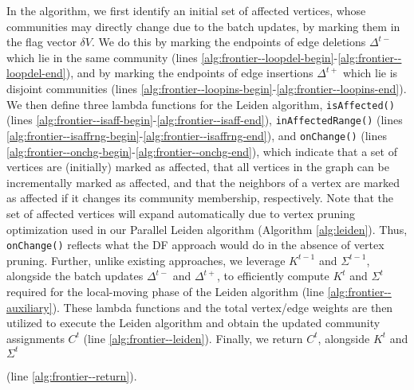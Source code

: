 In the algorithm, we first identify an initial set of affected vertices, whose communities may directly change due to the batch updates, by marking them in the flag vector $\delta V$. We do this by marking the endpoints of edge deletions $\Delta^{t-}$ which lie in the same community (lines \ref{alg:frontier--loopdel-begin}-\ref{alg:frontier--loopdel-end}), and by marking the endpoints of edge insertions $\Delta^{t+}$ which lie is disjoint communities (lines \ref{alg:frontier--loopins-begin}-\ref{alg:frontier--loopins-end}). We then define three lambda functions for the Leiden algorithm, \texttt{isAffected()} (lines \ref{alg:frontier--isaff-begin}-\ref{alg:frontier--isaff-end}), \texttt{inAffectedRange()} (lines \ref{alg:frontier--isaffrng-begin}-\ref{alg:frontier--isaffrng-end}), and \texttt{onChange()} (lines \ref{alg:frontier--onchg-begin}-\ref{alg:frontier--onchg-end}), which indicate that a set of vertices are (initially) marked as affected, that all vertices in the graph can be incrementally marked as affected, and that the neighbors of a vertex are marked as affected if it changes its community membership, respectively. Note that the set of affected vertices will expand automatically due to vertex pruning optimization used in our Parallel Leiden algorithm (Algorithm \ref{alg:leiden}). Thus, \texttt{onChange()} reflects what the DF approach would do in the absence of vertex pruning. Further, unlike existing approaches, we leverage $K^{t-1}$ and $\Sigma^{t-1}$, alongside the batch updates $\Delta^{t-}$ and $\Delta^{t+}$, to efficiently compute $K^t$ and $\Sigma^t$ required for the local-moving phase of the Leiden algorithm (line \ref{alg:frontier--auxiliary}). These lambda functions and the total vertex/edge weights are then utilized to execute the Leiden algorithm and obtain the updated community assignments $C^t$ (line \ref{alg:frontier--leiden}). Finally, we return $C^t$, alongside $K^t$ and $\Sigma^t$ (line \ref{alg:frontier--return}).
